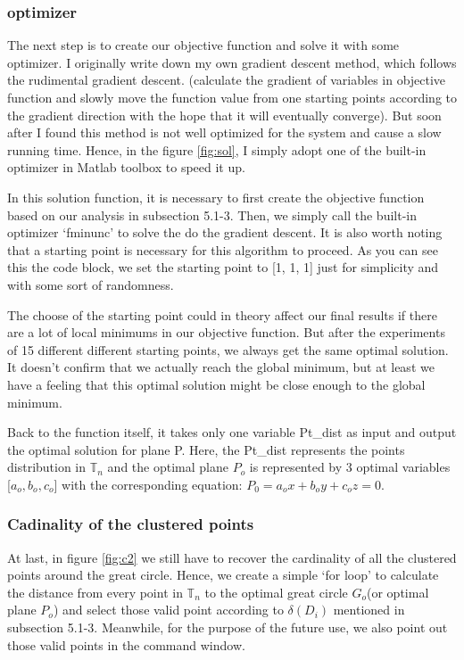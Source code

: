 \documentclass[12pt]{article}
\numberwithin{equation}{section}
\let\bb\mathbb
\let\bb\mathbb
\begin{document}
		\subsubsection{optimizer}
			The next step is to create our objective function and solve it with some optimizer. I originally write down my own gradient descent method, which follows the rudimental gradient descent. (calculate the gradient of variables in objective function and slowly move the function value from one starting points according to the gradient direction with the hope that it will eventually converge). But soon after I found this method is not well optimized for the system and cause a slow running time. Hence, in the figure \ref{fig:sol}, I simply adopt one of the built-in optimizer in Matlab toolbox to speed it up. \par 
			In this solution function, it is necessary to first create the objective function based on our analysis in subsection 5.1-3. Then, we simply call the built-in optimizer `fminunc' to solve the do the gradient descent. It is also worth noting that a starting point is necessary for this algorithm to proceed. As you can see this the code block, we set  the starting point to [1, 1, 1] just for simplicity and with some sort of randomness. \par 
			The choose of the starting point could in theory affect our final results if there are a lot of local minimums in our objective function. But after the experiments of 15 different different starting points, we always get the same optimal solution. It doesn't confirm that we actually reach the global minimum, but at least we have a feeling that this optimal solution might be close enough to the global minimum. \par 
			Back to the function itself, it takes only one variable Pt\_dist as input and output the optimal solution for plane P. Here, the Pt\_dist represents the points distribution in $\bb{T}_n$ and the optimal plane $P_o$ is represented by 3 optimal variables [$a_o, b_o, c_o$] with the corresponding equation: $P_0 = a_ox+b_oy+c_oz = 0$.
		\subsubsection{Cadinality of the clustered points}
			At last, in figure \ref{fig:c2} we still have to recover the cardinality of all the clustered points around the great circle. Hence, we create a simple `for loop' to calculate  the distance from every point in $\bb{T}_n$ to the optimal great circle $G_o$(or optimal plane $P_o$) and select those valid point according to $\delta(D_i)$ mentioned in subsection 5.1-3. Meanwhile, for the purpose of the future use, we also point out those valid points in the command window. 
	
\end{document}
